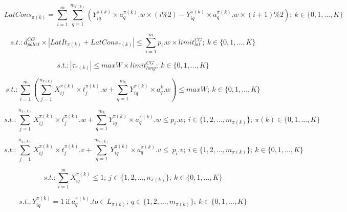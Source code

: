 \documentclass[preprint,authoryear]{elsarticle}
\begin{document}
\begin{equation} \label{eq:LatCons}
	LatCons_{\pi(k)} =  \sum_{i=1}^{m} \sum_{q=1}^{m_{\pi(k)}}  ( Y_{iq}^{\pi(k)} \times a_q^{\pi(k)}.w \times (i\%2) - Y_{iq}^{\pi(k)} \times a_q^{\pi(k)}.w \times (i+1)\%2); \ k \in \{0, 1, \ldots, K\}
\end{equation}

\begin{equation} \label{eq:torqlat}
	s.t.: d^{CG}_{pallet} \times | LatIt_{\pi(k)} + LatCons_{\pi(k)} | \leq  \sum_{i=1}^{m}p_i.w \times limit^{CG}_{lat}; \ k \in \{0, 1, \ldots, K\}
\end{equation}

\begin{equation} \label{eq:torqlong}
	s.t.: |\tau_{\pi(k)}| \leq maxW \times limit^{CG}_{long};\ k \in \{0, 1, \ldots, K\}
\end{equation}

\begin{equation} \label{eq:payload}
	s.t.: \sum_{i=1}^{m} (\sum_{j=1}^{n_{\pi(k)}} X_{ij}^{\pi(k)} \times t_j^{\pi(k)}.w + \sum_{q=1}^{m_k} Y_{iq}^{\pi(k)} \times a_q^k.w ) \leq maxW; \ k \in \{0, 1, \ldots, K\}
\end{equation}

\begin{equation} \label{eq:app2}
	s.t.: \sum_{j=1}^{n_{\pi(k)}} X_{ij}^{\pi(k)} \times t_j^{\pi(k)}.w + \sum_{q=1}^{m_k} Y_{iq}^{\pi(k)} \times a_q^{\pi(k)}.w  \leq p_i.w; \ i \in \{1, 2, \ldots, m_{\pi(k)}\}; \ {\pi(k)} \in \{0, 1, \ldots, K\}
\end{equation}

\begin{equation} \label{eq:app3}
	s.t.: \sum_{j=1}^{n_{\pi(k)}} X_{ij}^{\pi(k)} \times t_j^{\pi(k)}.v + \sum_{q=1}^{m_{\pi(k)}} Y_{iq}^{\pi(k)} \times a_q^{\pi(k)}.v  \leq\ p_i.v; \ i \in \{1, 2, \ldots, m_{\pi(k)}\}; \ k \in \{0, 1, \ldots, K\}
\end{equation}

\begin{equation} \label{eq:app4}
	s.t.: \sum_{i=1}^{m} X_{ij}^{\pi(k)} \leq 1; \ j \in \{1, 2, \ldots, n_{\pi(k)}\}; \ k \in \{0, 1, \ldots, K\}
\end{equation}

\begin{equation} \label{eq:app5}
	s.t.:  Y_{iq}^{\pi(k)} = 1 \ \mbox{if} \ a^{\pi(k)}_q.to \in L_{\pi(k)}; \ q \in \{1, 2, \ldots, m_{\pi(k)}\}; \ k \in \{0, 1, \ldots, K\}
\end{equation}
\end{document}
